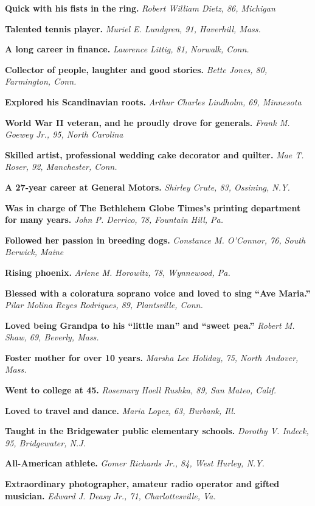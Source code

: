 \textbf{Quick with his fists in the ring.} \emph{Robert William Dietz,
86, Michigan}

\textbf{Talented tennis player.} \emph{Muriel E. Lundgren, 91,
Haverhill, Mass.}

\textbf{A long career in finance.} \emph{Lawrence Littig, 81, Norwalk,
Conn.}

\textbf{Collector of people, laughter and good stories.} \emph{Bette
Jones, 80, Farmington, Conn.}

\textbf{Explored his Scandinavian roots.} \emph{Arthur Charles Lindholm,
69, Minnesota}

\textbf{World War II veteran, and he proudly drove for generals.}
\emph{Frank M. Goewey Jr., 95, North Carolina}

\textbf{Skilled artist, professional wedding cake decorator and
quilter.} \emph{Mae T. Roser, 92, Manchester, Conn.}

\textbf{A 27-year career at General Motors.} \emph{Shirley Crute, 83,
Ossining, N.Y.}

\textbf{Was in charge of The Bethlehem Globe Times's printing department
for many years.} \emph{John P. Derrico, 78, Fountain Hill, Pa.}

\textbf{Followed her passion in breeding dogs.} \emph{Constance M.
O'Connor, 76, South Berwick, Maine}

\textbf{Rising phoenix.} \emph{Arlene M. Horowitz, 78, Wynnewood, Pa.}

\textbf{Blessed with a coloratura soprano voice and loved to sing ``Ave
Maria.''} \emph{Pilar Molina Reyes Rodriques, 89, Plantsville, Conn.}

\textbf{Loved being Grandpa to his ``little man'' and ``sweet pea.''}
\emph{Robert M. Shaw, 69, Beverly, Mass.}

\textbf{Foster mother for over 10 years.} \emph{Marsha Lee Holiday, 75,
North Andover, Mass.}

\textbf{Went to college at 45.} \emph{Rosemary Hoell Rushka, 89, San
Mateo, Calif.}

\textbf{Loved to travel and dance.} \emph{Maria Lopez, 63, Burbank,
Ill.}

\textbf{Taught in the Bridgewater public elementary schools.}
\emph{Dorothy V. Indeck, 95, Bridgewater, N.J.}

\textbf{All-American athlete.} \emph{Gomer Richards Jr., 84, West
Hurley, N.Y.}

\textbf{Extraordinary photographer, amateur radio operator and gifted
musician.} \emph{Edward J. Deasy Jr., 71, Charlottesville, Va.}

